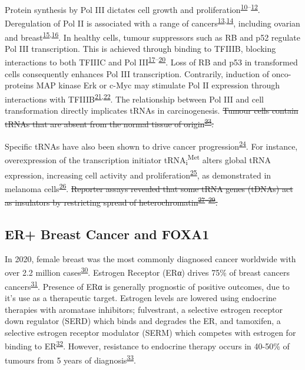 \documentclass[
  11pt,
]{article}
\begin{document}
Protein synthesis by Pol III dictates cell growth and proliferation\textsuperscript{\protect\hyperlink{ref-Brooks1977}{10}--\protect\hyperlink{ref-Zetterberg1965}{12}}.
Deregulation of Pol II is associated with a range of cancers\textsuperscript{\protect\hyperlink{ref-Zhang2018}{13},\protect\hyperlink{ref-Pavon-Eternod2009}{14}}, including ovarian and breast\textsuperscript{\protect\hyperlink{ref-Winter2000}{15},\protect\hyperlink{ref-Krishnan2016}{16}}.
In healthy cells, tumour suppressors such as RB and p52 regulate Pol III transcription.
This is achieved through binding to TFIIIB, blocking interactions to both TFIIIC and Pol III\textsuperscript{\protect\hyperlink{ref-White1996}{17}--\protect\hyperlink{ref-Crighton2003}{20}}.
Loss of RB and p53 in transformed cells consequently enhances Pol III transcription.
Contrarily, induction of onco-proteins MAP kinase Erk or c-Myc may stimulate Pol II expression through interactions with TFIIIB\textsuperscript{\protect\hyperlink{ref-Gomez-Roman2003}{21},\protect\hyperlink{ref-Felton-Edkins2003}{22}}.
The relationship between Pol III and cell transformation directly implicates tRNAs in carcinogenesis.
\sout{Tumour cells contain tRNAs that are absent from the normal tissue of origin\textsuperscript{\protect\hyperlink{ref-kuchino1978}{23}}.}

Specific tRNAs have also been shown to drive cancer progression\textsuperscript{\protect\hyperlink{ref-Goodarzi2016}{24}}.
For instance, overexpression of the transcription initiator tRNA\textsubscript{i}\textsuperscript{Met} alters global tRNA expression, increasing cell activity and proliferation\textsuperscript{\protect\hyperlink{ref-Pavon-Eternod2013}{25}}, as demonstrated in melanoma cells\textsuperscript{\protect\hyperlink{ref-Birch2016}{26}}.
\sout{Reporter assays revealed that some tRNA genes (tDNAs) act as insulators by restricting spread of heterochromatin\textsuperscript{\protect\hyperlink{ref-raab2011}{27}--\protect\hyperlink{ref-sizer2022}{29}}.}

\hypertarget{er-breast-cancer-and-foxa1}{%
\subsection{ER+ Breast Cancer and FOXA1}\label{er-breast-cancer-and-foxa1}}

In 2020, female breast was the most commonly diagnosed cancer worldwide with over 2.2 million cases\textsuperscript{\protect\hyperlink{ref-Sung2021}{30}}.
Estrogen Receptor (ERα) drives 75\% of breast cancers cancers\textsuperscript{\protect\hyperlink{ref-allred2004}{31}}.
Presence of ERα is generally prognostic of positive outcomes, due to it's use as a therapeutic target.
Estrogen levels are lowered using endocrine therapies with aromatase inhibitors; fulvestrant, a selective estrogen receptor down regulator (SERD) which binds and degrades the ER, and tamoxifen, a selective estrogen receptor modulator (SERM) which competes with estrogen for binding to ER\textsuperscript{\protect\hyperlink{ref-Johnston2018}{32}}.
However, resistance to endocrine therapy occurs in 40-50\% of tumours from 5 years of diagnosis\textsuperscript{\protect\hyperlink{ref-Anurag2018}{33}}.
\end{document}
